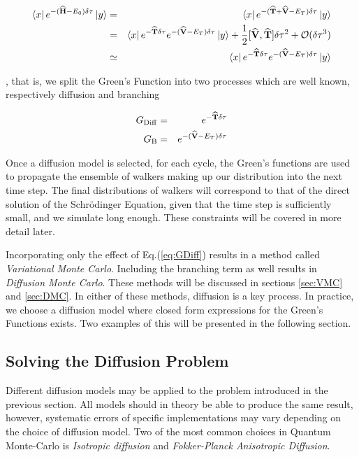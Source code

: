 \begin{eqnarray}
 \left< x \right|e^{-({\bf\widehat{H}} - E_0)\delta\tau}\left| y \right> &=& \left< x \right|e^{-({\bf\widehat{T}} + {\bf\widehat{V}} - E_T)\delta\tau}\left| y \right> \nonumber \\
                                             &=& \left< x \right|e^{-{\bf\widehat{T}}\delta\tau}e^{-({\bf\widehat{V}} - E_T)\delta\tau}\left| y \right> + \frac{1}{2}[{\bf\widehat{V}}, {\bf\widehat{T}}]\delta\tau^2 + \mathcal{O}(\delta\tau^3) \nonumber \\
                                             &\simeq& \left< x \right|e^{-{\bf\widehat{T}}\delta\tau}e^{-({\bf\widehat{V}} - E_T)\delta\tau}\left| y \right> \label{eq:shortTimeApprox}
\end{eqnarray}

, that is, we split the Green's Function into two processes which are well known, respectively diffusion and branching

\begin{eqnarray}
 G_\mathrm{Diff} &=& e^{-{\bf\widehat{T}}\delta\tau}\label{eq:GDiff} \\
 G_\mathrm{B} &=& e^{-({\bf\widehat{V}} - E_T)\delta\tau} \label{eq:GB}
\end{eqnarray}


Once a diffusion model is selected, for each cycle, the Green's functions are used to propagate the ensemble of walkers making up our distribution into the next time step. The final distributions of walkers will correspond to that of the direct solution of the Schrödinger Equation, given that the time step is sufficiently small, and we simulate long enough. These constraints will be covered in more detail later. 

Incorporating only the effect of Eq.(\ref{eq:GDiff}) results in a method called \textit{Variational Monte Carlo}. Including the branching term as well results in \textit{Diffusion Monte Carlo}. These methods will be discussed in sections \ref{sec:VMC} and \ref{sec:DMC}. In either of these methods, diffusion is a key process. In practice, we choose a diffusion model where closed form expressions for the Green's Functions exists. Two examples of this will be presented in the following section.

\subsection{Solving the Diffusion Problem}

Different diffusion models may be applied to the problem introduced in the previous section. All models should in theory be able to produce the same result, however, systematic errors of specific implementations may vary depending on the choice of diffusion model. Two of the most common choices in Quantum Monte-Carlo is \textit{Isotropic diffusion} and \textit{Fokker-Planck Anisotropic Diffusion}.

